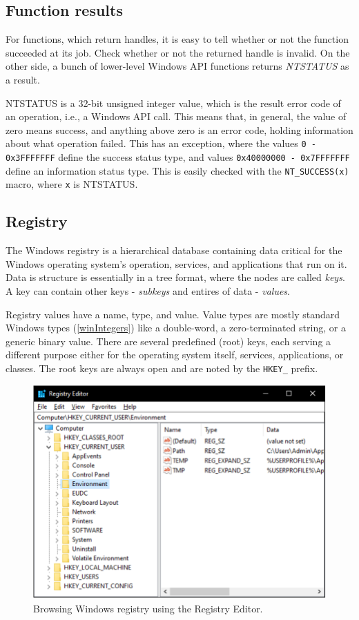 \subsection*{Function results}
For functions, which return handles, it is easy to tell whether or not the function succeeded at its job. Check whether or not the returned handle is invalid. On the other side, a bunch of lower-level Windows API functions returns \textit{NTSTATUS} as a result.

NTSTATUS is a 32-bit unsigned integer value, which is the result error code of an operation, i.e., a Windows API call. This means that, in general, the value of zero means success, and anything above zero is an error code, holding information about what operation failed. This has an exception, where the values \lstinline{0 - 0x3FFFFFFF} define the success status type, and values 
\lstinline{0x40000000 - 0x7FFFFFFF} define an information status type. This is easily checked with the \lstinline{NT_SUCCESS(x)} macro, where \lstinline{x} is NTSTATUS.\cite{WinNTSTATUS}\cite{WinNTSuccess}

\subsection*{Registry}
The Windows registry is a hierarchical database containing data critical for the Windows operating system's operation, services, and applications that run on it. Data is structure is essentially in a tree format, where the nodes are called \textit{keys}. A key can contain other keys - \textit{subkeys} and entires of data - \textit{values}. 

Registry values have a name, type, and value. Value types are mostly standard Windows types (\ref{winIntegers}) like a double-word, a zero-terminated string, or a generic binary value. There are several predefined (root) keys, each serving a different purpose either for the operating system itself, services, applications, or classes. The root keys are always open and are noted by the \lstinline{HKEY_} prefix.

\begin{figure}[htb!]
	\centering
	\includegraphics[]{obrazky-figures/regedit.pdf}
	\caption{Browsing Windows registry using the Registry Editor.}
	\label{winRegedit}
\end{figure}

